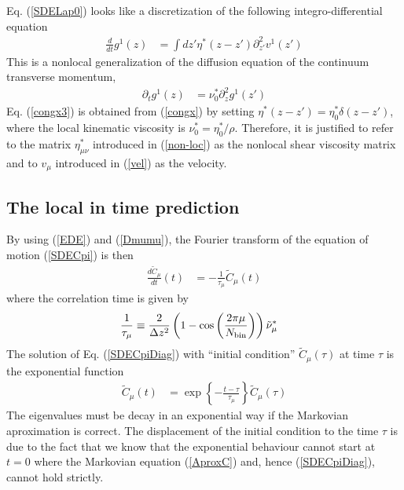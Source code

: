 \documentclass[b5paper,openright,11pt]{book}
\begin{document}
Eq. (\ref{SDELap0}) looks    like    a   discretization    of    the    following
integro-differential  equation
\begin{align}
  \frac{d}{dt} g^1(z)&=\int dz'{\eta}^*(z-z')\partial^2_{z'} v^1(z')
\label{congx}
\end{align}
This is  a nonlocal generalization  of the diffusion equation  of the
continuum transverse  momentum,
\begin{align}
  \partial_t g^1(z)&=\nu^*_0\partial^2_{z}g^1(z')
\label{congx3}
\end{align}
Eq.   (\ref{congx3})   is  obtained  from  (\ref{congx})   by  setting
$\eta^*(z-z')=\eta^*_0\delta(z-z')$,   where   the   local   kinematic
viscosity is  $\nu^*_0=\eta^*_0/\rho$.  Therefore, it is  justified to
refer to the matrix $\eta^*_{\mu\nu}$ introduced in (\ref{non-loc}) as
the  nonlocal shear  viscosity matrix  and to  $v_\mu$ introduced  in
(\ref{vel}) as the velocity.


\subsection{The local in time prediction}
By using (\ref{EDE})  and (\ref{Dmumu}), the Fourier  transform of the
equation of motion (\ref{SDECpi}) is then
\begin{align}
  \frac{d\tilde{C}_\mu}{dt}(t)&=-\frac{1}{\tau_\mu}\tilde{C}_\mu(t)  
\label{SDECpiDiag}
\end{align}
where the correlation time is given by 
\begin{align}
 \frac{1}{\tau_\mu}&\equiv \frac{2}{\Delta z^2}
\left(1-\cos\left( \frac{2\pi \mu}{N_{\rm bin}}\right)\right)
\tilde{\nu}_\mu^*
\label{taumu}
\end{align}
The  solution of  Eq.  (\ref{SDECpiDiag})  with ``initial  condition''
$\tilde{C}_\mu(\tau)$ at time $\tau$ is the exponential function
\begin{align}
  \tilde{C}_\mu(t)&=\exp\left\{-\frac{t-\tau}{\tau_\mu}\right\}  \tilde{C}_\mu(\tau)
\label{solexp}
\end{align}
The eigenvalues must be decay in an exponential way if the Markovian aproximation is correct. 
The displacement of the initial condition to the time $\tau$ is due to
the fact that  we know that the exponential behaviour  cannot start at
$t=0$  where   the  Markovian  equation  (\ref{AproxC})   and,  hence
(\ref{SDECpiDiag}), cannot hold strictly.
\end{document}
